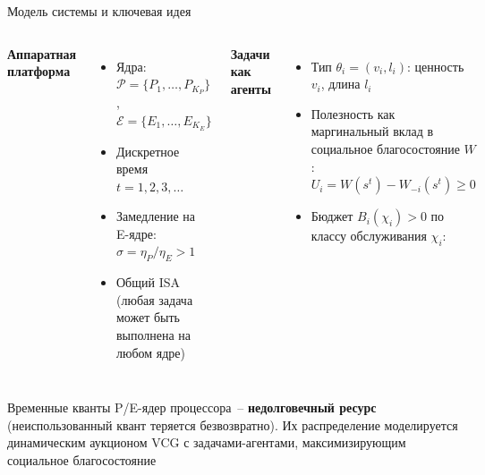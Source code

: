 \documentclass[aspectratio=169,11pt]{beamer}
\begin{document}
\begin{frame}{Модель системы и ключевая идея}
        \footnotesize
        \begin{columns}[T]
                \textbf{Аппаратная платформа}
                \begin{itemize}
                        \item Ядра: $\mathcal{P} = \{P_1,\ldots,P_{K_P}\}$,\;
                                $\mathcal{E} = \{E_1,\ldots,E_{K_E}\}$
                        \item Дискретное время $t = 1,2,3,\ldots$
                        \item Замедление на E-ядре:
                                $\sigma = \eta_P/\eta_E > 1$
                        \item Общий ISA (любая задача может быть
                                выполнена на любом ядре)
                \end{itemize}

                \textbf{Задачи как агенты}
                \begin{itemize}
                        \item Тип $\theta_i = (v_i, l_i)$: ценность $v_i$,
                                длина $l_i$
                        \item Полезность как маргинальный вклад в
                                социальное благосостояние $W$:
                                $U_i = W(s^t) - W_{-i}(s^t) \geq 0$
                        \item Бюджет $B_i(\chi_i) > 0$ по классу
                                обслуживания $\chi_i$:
                \end{itemize}
                \vspace{0.2em}
        \end{columns}

        \vspace{0.5em}
        \begin{shadowbox4}
                \scriptsize Временные кванты P/E\nobreakdash-ядер
                процессора~-- \textbf{недолговечный ресурс}
                (неиспользованный квант теряется безвозвратно). Их
                распределение моделируется динамическим аукционом VCG
                с задачами\nobreakdash-агентами, максимизирующим социальное
                благосостояние
        \end{shadowbox4}
\end{frame}
\end{document}
